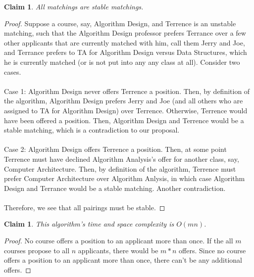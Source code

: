 \documentclass[11pt]{article}
\newtheorem{claim}[theorem]{Claim}
\begin{document}
	\begin{claim} 
		All matchings are stable matchings.
	\end{claim}
	\begin{proof}
		Suppose a course, say, Algorithm Design, and Terrence is an unstable matching, such that the Algorithm Design professor prefers Terrance over a few other applicants that are currently matched with him, call them Jerry and Joe, and Terrance prefers to TA for Algorithm Design versus Data Structures, which he is currently matched (or is not put into any any class at all). Consider two cases.\\
		\\
		Case 1: Algorithm Design never offers Terrence a position. Then, by definition of the algorithm, Algorithm Design prefers Jerry and Joe (and all others who are assigned to TA for Algorithm Design) over Terrence. Otherwise, Terrence would have been offered a position. Then, Algorithm Design and Terrence would be a stable matching, which is a contradiction to our proposal. \\
		\\
		Case 2: Algorithm Design offers Terrence a position. Then, at some point Terrence must have declined Algorithm Analysis's offer for another class, say, Computer Architecture. Then, by definition of the algorithm, Terrence must prefer Computer Architecture over Algorithm Anlysis, in which case Algorithm Design and Terrance would be a stable matching. Another contradiction.\\
		\\
		Therefore, we see that all pairings must be stable. 
	\end{proof}

	\begin{claim} 
		This algorithm's time and space complexity is $O(mn)$.
	\end{claim}
	\begin{proof}
	No course offers a position to an applicant more than once. If the all $m$ courses propose to all $n$ applicants, there would be $m*n$ offers. Since no course offers a position to an applicant more than once, there can’t be any additional offers.
	\end{proof}
	
	\newpage
	
	
\end{document}
